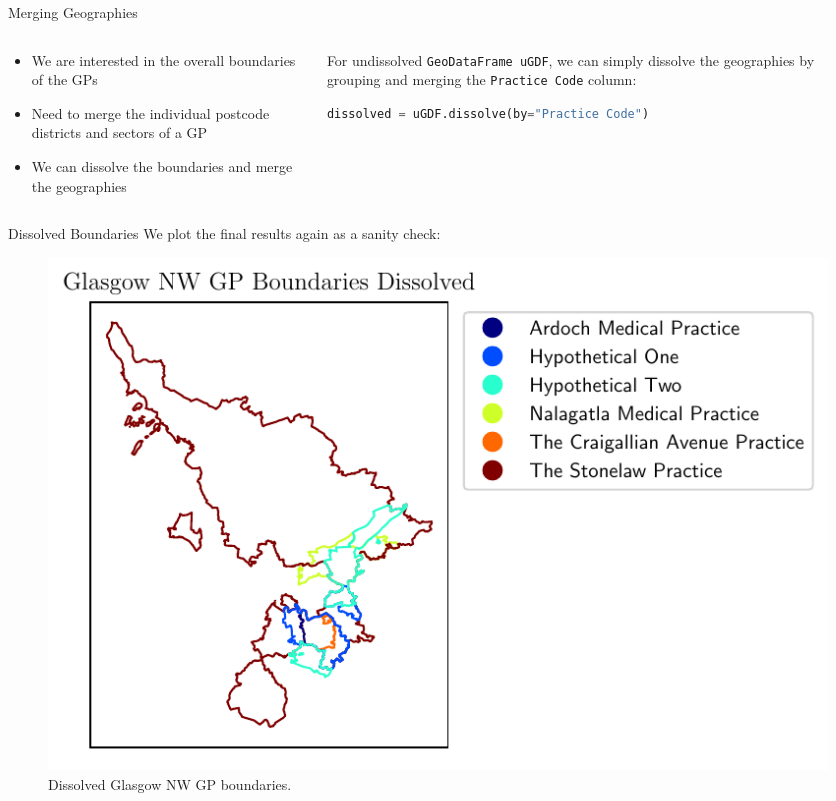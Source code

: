 \documentclass[hyperref={breaklinks,colorlinks,
   urlcolor=blue,citecolor=blue,linkcolor=red}]{beamer}
\begin{document}
\begin{frame}[fragile]{Merging Geographies}
\begin{columns}
\begin{column}{0.5\textwidth}
\begin{itemize}
\item{We are interested in the overall boundaries of the GPs}
\item{Need to merge the individual postcode districts and sectors of a GP}
\item{We can dissolve the boundaries and merge the geographies}
\end{itemize}
\end{column}

\begin{column}{0.6\textwidth}
For undissolved \texttt{GeoDataFrame uGDF}, we can simply dissolve the geographies by grouping and merging the \texttt{Practice Code} column:
\begin{lstlisting}[language=Python,frame=single]
dissolved = uGDF.dissolve(by="Practice Code")
\end{lstlisting} 
\end{column}
\end{columns}
\end{frame}

\begin{frame}{Dissolved Boundaries}
We plot the final results again as a sanity check:
\begin{figure}
\begin{center}
\includegraphics[scale=0.6]{geography_dissolved}
\caption{Dissolved Glasgow NW GP boundaries.}
\end{center}
\end{figure}
\end{frame}
\end{document}
